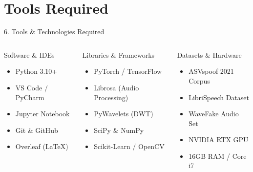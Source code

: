 \documentclass[10pt, aspectratio=169]{beamer}
\begin{document}
\section{Tools Required}
\begin{frame}{6. Tools \& Technologies Required}
  \begin{columns}
      \begin{block}{Software \& IDEs}
        \begin{itemize}
          \item Python 3.10+
          \item VS Code / PyCharm
          \item Jupyter Notebook
          \item Git \& GitHub
          \item Overleaf (LaTeX)
        \end{itemize}
      \end{block}

      \begin{block}{Libraries \& Frameworks}
        \begin{itemize}
          \item PyTorch / TensorFlow
          \item Librosa (Audio Processing)
          \item PyWavelets (DWT)
          \item SciPy \& NumPy
          \item Scikit-Learn / OpenCV
        \end{itemize}
      \end{block}

      \begin{block}{Datasets \& Hardware}
        \begin{itemize}
          \item ASVspoof 2021 Corpus
          \item LibriSpeech Dataset
          \item WaveFake Audio Set
          \item NVIDIA RTX GPU
          \item 16GB RAM / Core i7
        \end{itemize}
      \end{block}
  \end{columns}
\end{frame}

\end{document}
